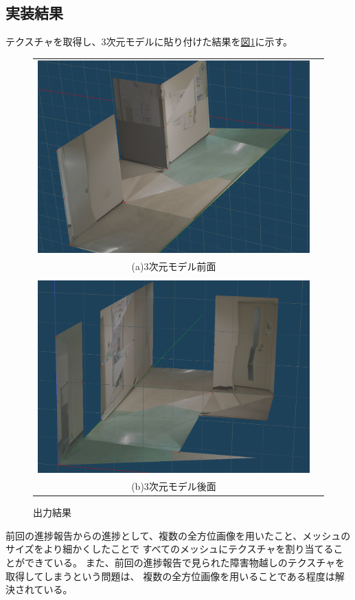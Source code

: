 \documentclass[]{jarticle}          %
\begin{document}
\subsection{実装結果}
テクスチャを取得し、3次元モデルに貼り付けた結果を\hyperref[one]{図\ref{one}}に示す。
\begin{figure}[!ht]
  \begin{center}
    \begin{tabular}{cc}
      \includegraphics[keepaspectratio, scale=0.3]{figures/3dmodel1.png}\\
      (a)3次元モデル前面\\
      \\
      \includegraphics[keepaspectratio, scale=0.3]{figures/3dmodel2.png}\\
      (b)3次元モデル後面\\
    \end{tabular}
  \end{center}
  \caption{出力結果}
  \label{one}
\end{figure}
前回の進捗報告からの進捗として、複数の全方位画像を用いたこと、メッシュのサイズをより細かくしたことで
すべてのメッシュにテクスチャを割り当てることができている。
また、前回の進捗報告で見られた障害物越しのテクスチャを取得してしまうという問題は、
複数の全方位画像を用いることである程度は解決されている。
\end{document}
